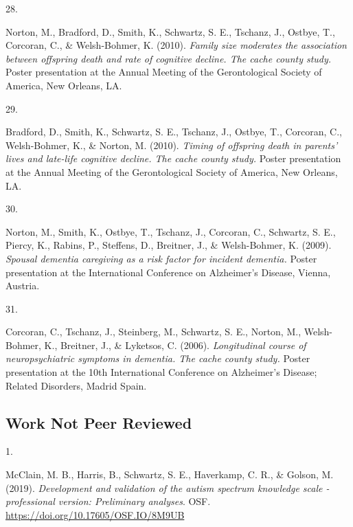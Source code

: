 \documentclass[11pt,a4paper,]{moderncv}
\newlength{\csllabelwidth}
\newcommand{\CSLLeftMargin}[1]{\parbox[t]{\csllabelwidth}{#1}}
\newcommand{\CSLRightInline}[1]{\parbox[t]{\linewidth - \csllabelwidth}{#1}}
\begin{document}
\leavevmode\hypertarget{ref-maria2010pres}{}%
\CSLLeftMargin{28. }
\CSLRightInline{Norton, M., Bradford, D., Smith, K., Schwartz, S. E.,
Tschanz, J., Ostbye, T., Corcoran, C., \& Welsh-Bohmer, K. (2010).
\emph{Family size moderates the association between offspring death and
rate of cognitive decline. The cache county study.} Poster presentation
at the Annual Meeting of the Gerontological Society of America, New
Orleans, LA.}

\leavevmode\hypertarget{ref-brandford2010pres}{}%
\CSLLeftMargin{29. }
\CSLRightInline{Bradford, D., Smith, K., Schwartz, S. E., Tschanz, J.,
Ostbye, T., Corcoran, C., Welsh-Bohmer, K., \& Norton, M. (2010).
\emph{Timing of offspring death in parents' lives and late-life
cognitive decline. The cache county study.} Poster presentation at the
Annual Meeting of the Gerontological Society of America, New Orleans,
LA.}

\leavevmode\hypertarget{ref-maria2009pres}{}%
\CSLLeftMargin{30. }
\CSLRightInline{Norton, M., Smith, K., Ostbye, T., Tschanz, J.,
Corcoran, C., Schwartz, S. E., Piercy, K., Rabins, P., Steffens, D.,
Breitner, J., \& Welsh-Bohmer, K. (2009). \emph{Spousal dementia
caregiving as a risk factor for incident dementia.} Poster presentation
at the International Conference on Alzheimer's Disease, Vienna,
Austria.}

\leavevmode\hypertarget{ref-chris2009pres}{}%
\CSLLeftMargin{31. }
\CSLRightInline{Corcoran, C., Tschanz, J., Steinberg, M., Schwartz, S.
E., Norton, M., Welsh-Bohmer, K., Breitner, J., \& Lyketsos, C. (2006).
\emph{Longitudinal course of neuropsychiatric symptoms in dementia. The
cache county study.} Poster presentation at the 10th International
Conference on Alzheimer's Disease; Related Disorders, Madrid Spain.}

\vspace{7mm}

\hypertarget{work-not-peer-reviewed}{%
\subsection{\texorpdfstring{\textbf{Work Not Peer
Reviewed}}{Work Not Peer Reviewed}}\label{work-not-peer-reviewed}}

\hypertarget{refs_notpeer}{}
\leavevmode\hypertarget{ref-McClain_Harris_Schwartz_Haverkamp_Golson_2019}{}%
\CSLLeftMargin{1. }
\CSLRightInline{McClain, M. B., Harris, B., Schwartz, S. E., Haverkamp,
C. R., \& Golson, M. (2019). \emph{Development and validation of the
autism spectrum knowledge scale - professional version: Preliminary
analyses}. OSF. \url{https://doi.org/10.17605/OSF.IO/8M9UB}}
\end{document}

